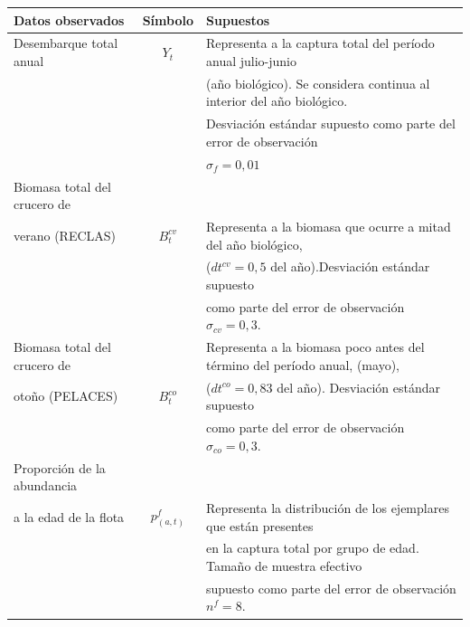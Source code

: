 \documentclass[
  spanish,
]{article}
\begin{document}
\begin{table}[h]
    \centering
    \resizebox{16cm}{!} {
    \begin{tabular}{|l|c|l|}
    \hline
 Datos observados              & Símbolo          & Supuestos                                                            \\ \hline
 Desembarque total anual       &$Y_t$             & Representa a la captura total del período anual julio-junio          \\ 
                               &                  & (año biológico). Se considera continua al interior del año biológico.\\
                               &                  & Desviación estándar supuesto como parte del error de observación     \\
                               &                  & $\sigma_f=0,01$                                                      \\ \hline
 Biomasa total del crucero de  &                  &                                                                      \\
 verano (RECLAS)               & $B_t^{cv}$       & Representa a la biomasa que ocurre a mitad del año biológico,        \\
                               &                  & ($dt^{cv}=0,5$ del año).Desviación estándar supuesto \\
                               &                  & como parte del error de observación  $\sigma_{cv}=0,3$.\\ \hline
Biomasa total del crucero de   &                  & Representa a la biomasa poco antes del término del período anual, (mayo), \\
otoño (PELACES)                & $B_t^{co}$       & ($dt^{co}=0,83$ del año). Desviación estándar supuesto \\
                               &                  & como parte del error de observación $\sigma_{co}=0,3$. \\ \hline
Proporción de la abundancia    &                  & \\
a la edad de la flota          & $p_{(a,t)}^f$    & Representa la distribución de los ejemplares que están presentes \\ 
                               &                  & en la captura total por grupo de edad. Tamaño de muestra efectivo \\
                               &                  & supuesto como parte del error de observación  $n^f=8$.\\ \hline

\end{tabular}}
\end{table}
\end{document}
